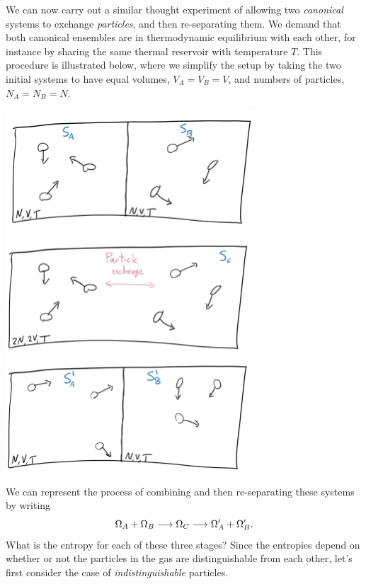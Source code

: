We can now carry out a similar thought experiment of allowing two \emph{canonical} systems to exchange \emph{particles}, and then re-separating them.
We demand that both canonical ensembles are in thermodynamic equilibrium with each other, for instance by sharing the same thermal reservoir with temperature $T$.
This procedure is illustrated below, where we simplify the setup by taking the two initial systems to have equal volumes, $V_A = V_B = V$, and numbers of particles, $N_A = N_B = N$.

\begin{center}
  \includegraphics[width=0.7\textwidth]{figs/unit04_mixing.pdf}
\end{center}

We can represent the process of combining and then re-separating these systems by writing
\begin{equation*}
  \Omega_A + \Omega_B \longrightarrow \Omega_C \longrightarrow \Omega_A' + \Omega_B'.
\end{equation*}
What is the entropy for each of these three stages?
Since the entropies depend on whether or not the particles in the gas are distinguishable from each other, let's first consider the case of \textit{indistinguishable} particles.

